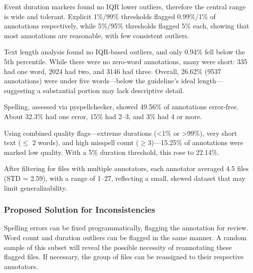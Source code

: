 \documentclass{article}
\begin{document}
Event duration markers found no IQR lower outliers, therefore the central range is wide and tolerant. Explicit 1\%/99\% thresholds flagged 0.99\%/1\% of annotations respectively, while 5\%/95\% thresholds flagged 5\% each, showing that most annotations are reasonable, with few consistent outliers.

Text length analysis found no IQR-based outliers, and only 0.94\% fell below the 5th percentile. While there were no zero-word annotations, many were short: 335 had one word, 2024 had two, and 3146 had three. Overall, 26.62\% (9537 annotations) were under five words—below the guideline's ideal length—suggesting a substantial portion may lack descriptive detail.

\begin{table}[H]
  \caption{Word Count Outcomes}
  \label{tab:word_outcomes}
  \centering
\end{table}

Spelling, assessed via pyspellchecker, showed 49.56\% of annotations error-free. About 32.3\% had one error, 15\% had 2–3, and 3\% had 4 or more.

Using combined quality flags—extreme durations (<1\% or >99\%), very short text ($\leq$ 2 words), and high misspell count ($\geq$3)—15.25\% of annotations were marked low quality. With a 5\% duration threshold, this rose to 22.14\%.

After filtering for files with multiple annotators, each annotator averaged 4.5 files (STD = 2.59), with a range of 1–27, reflecting a small, skewed dataset that may limit generalizability.

\subsubsection{Proposed Solution for Inconsistencies}

Spelling errors can be fixed programmatically, flagging the annotation for review. Word count and duration outliers can be flagged in the same manner. A random sample of this subset will reveal the possible necessity of reannotating these flagged files. If necessary, the group of files can be reassigned to their respective annotators.
\end{document}
